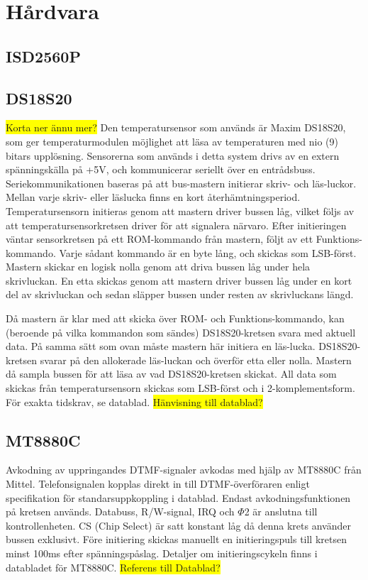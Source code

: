 \documentclass[a4paper,11pt]{article}
\begin{document}
\section{Hårdvara}
\label{hårdvara}
	\subsection{ISD2560P}

	\subsection{DS18S20}
	\label{DS18S20}
		\colorbox{yellow}{Korta ner ännu mer?}
		Den temperatursensor som används är Maxim DS18S20, som ger temperaturmodulen möjlighet att läsa av temperaturen
		med nio (9) bitars upplösning. Sensorerna som används i detta system drivs av en extern spänningskälla på +5V,
		och kommunicerar seriellt över en entrådsbuss. Seriekommunikationen baseras på att bus-mastern initierar skriv-
		och läs-luckor. Mellan varje skriv- eller läslucka finns en kort återhämtningsperiod. Temperatursensorn initieras genom att mastern
		driver bussen låg, vilket följs av att temperatursensorkretsen driver för att signalera närvaro.
		Efter initieringen väntar sensorkretsen på ett ROM-kommando från mastern,
		följt av ett Funktions-kommando. Varje sådant kommando är en byte lång, och skickas som LSB-först. Mastern skickar
		en logisk nolla genom att driva bussen låg under hela skrivluckan. En etta skickas genom att mastern driver bussen låg
		under en kort del av skrivluckan och sedan släpper bussen under resten av skrivluckans längd. 

		Då mastern är klar med att skicka över ROM- och Funktions-kommando, kan (beroende på vilka kommandon som sändes) DS18S20-kretsen
		svara med aktuell data. På samma sätt som ovan måste mastern här initiera en läs-lucka. 
		DS18S20-kretsen svarar på den allokerade läs-luckan och överför etta eller nolla. Mastern då sampla bussen för att läsa av vad DS18S20-kretsen skickat. All data som skickas från
		temperatursensorn skickas som LSB-först och i 2-komplementsform. För exakta tidskrav, se datablad.
		\colorbox{yellow}{Hänvisning till datablad?}\\

	\subsection{MT8880C}
	\label{MT8880C}
		Avkodning av uppringandes DTMF-signaler avkodas med hjälp av MT8880C från Mittel. 
		Telefonsignalen kopplas direkt in till DTMF-överföraren enligt specifikation för standarsuppkoppling i datablad. Endast avkodningsfunktionen på 		kretsen används. Databuss, R/W-signal, IRQ och $\Phi$2 är anslutna till kontrollenheten. 
		CS (Chip Select) är satt konstant låg då denna krets använder bussen exklusivt. 
Före initiering skickas manuellt en initieringspuls till kretsen minst 100ms efter spänningspåslag. Detaljer om initieringscykeln finns i databladet för MT8880C.
\colorbox{yellow}{Referens till Datablad?} \\
\end{document}

